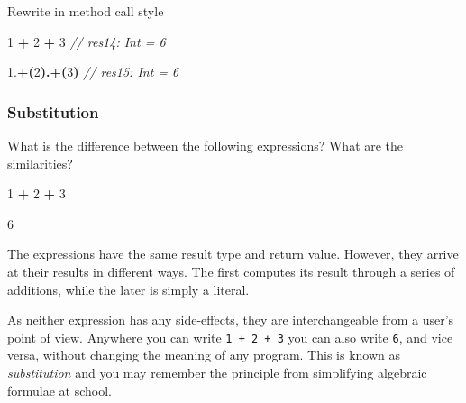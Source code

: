 \documentclass[11pt,a5paper,]{book}
\newenvironment{Shaded}{\begin{snugshade}}{\end{snugshade}}
\newcommand{\CommentTok}[1]{\textcolor[rgb]{0.56,0.35,0.01}{\textit{#1}}}
\newcommand{\DecValTok}[1]{\textcolor[rgb]{0.00,0.00,0.81}{#1}}
\newcommand{\FloatTok}[1]{\textcolor[rgb]{0.00,0.00,0.81}{#1}}
\newcommand{\OperatorTok}[1]{\textcolor[rgb]{0.81,0.36,0.00}{\textbf{#1}}}
\begin{document}
Rewrite in method call style

\begin{Shaded}
\begin{Highlighting}[]
\DecValTok{1} \OperatorTok{+} \DecValTok{2} \OperatorTok{+} \DecValTok{3}
\CommentTok{// res14: Int = 6}
\end{Highlighting}
\end{Shaded}

\begin{Shaded}
\begin{Highlighting}[]
\FloatTok{1.}\OperatorTok{+(}\DecValTok{2}\OperatorTok{).+(}\DecValTok{3}\OperatorTok{)}
\CommentTok{// res15: Int = 6}
\end{Highlighting}
\end{Shaded}

\hypertarget{substitution}{%
\subsubsection{Substitution}\label{substitution}}

What is the difference between the following expressions? What are the
similarities?

\begin{Shaded}
\begin{Highlighting}[]
\DecValTok{1} \OperatorTok{+} \DecValTok{2} \OperatorTok{+} \DecValTok{3}

\DecValTok{6}
\end{Highlighting}
\end{Shaded}

The expressions have the same result type and return value. However,
they arrive at their results in different ways. The first computes its
result through a series of additions, while the later is simply a
literal.

As neither expression has any side-effects, they are interchangeable
from a user's point of view. Anywhere you can write
\texttt{1\ +\ 2\ +\ 3} you can also write \texttt{6}, and vice versa,
without changing the meaning of any program. This is known as
\emph{substitution} and you may remember the principle from simplifying
algebraic formulae at school.
\end{document}
